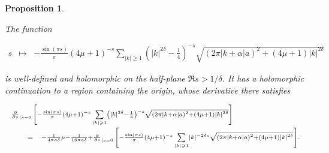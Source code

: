 \documentclass{jams-l}
\newtheorem{proposition}[theorem]{Proposition}
\theoremstyle{definition}
\theoremstyle{remark}
\numberwithin{equation}{section}
\begin{document}
            \begin{proposition}
            \label{PropA3}
            
                The function
                
                \[ \begin{array}{lll}
                        s & \longmapsto & - \frac{\sin \left( \pi s \right)}{\pi} \left( 4 \mu + 1 \right)^{-s} \sum\limits_{\left \vert k \right \vert \geqslant 1} \left( \left \vert k \right \vert^{2 \delta} - \frac{1}{4} \right)^{-s} \sqrt{\left( 2 \pi \left \vert k + \alpha \right \vert a \right)^2 + \left( 4 \mu + 1 \right) \left \vert k \right \vert^{2 \delta}}
                    \end{array} \]
                
                \noindent is well-defined and holomorphic on the half-plane $\Re s > 1 / \delta$. It has a holomorphic continuation to a region containing the origin, whose derivative there satisfies
                
                \[ \begin{array}{lll}
                        \multicolumn{3}{l}{\scriptstyle \frac{\partial}{\partial s}_{\left \vert s = 0 \right.} \left[ - \frac{\sin \left( \pi s \right)}{\pi} \left( 4 \mu + 1 \right)^{-s} \sum\limits_{\left \vert k \right \vert \geqslant 1} \left( \left \vert k \right \vert^{2 \delta} - \frac{1}{4} \right)^{-s} \sqrt{\left( 2 \pi \left \vert k + \alpha \right \vert a \right)^2 + \left( 4 \mu + 1 \right) \left \vert k \right \vert^{2 \delta}} \right]} \\[1em]
                        
                        \quad & \scriptstyle = & \scriptstyle - \frac{1}{4 \pi a \delta} \mu - \frac{1}{16 \pi a \delta} + \frac{\partial}{\partial s}_{\left \vert s = 0 \right.} \left[ - \frac{\sin \left( \pi s \right)}{\pi} \left( 4 \mu + 1 \right)^{-s} \sum\limits_{\left \vert k \right \vert \geqslant 1} \left \vert k \right \vert^{- 2 \delta s} \sqrt{\left( 2 \pi \left \vert k + \alpha \right \vert a \right)^2 + \left( 4 \mu + 1 \right) \left \vert k \right \vert^{2 \delta}} \right].
                    \end{array} \]
            
            \end{proposition}
            
\end{document}
